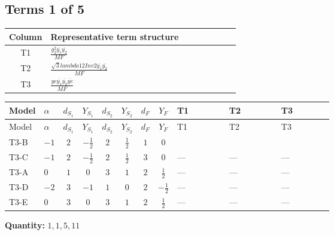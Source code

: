 \documentclass[8pt]{article}
\begin{document}
\begin{landscape}
\subsection*{Terms 1 of 5}
\begin{center}
\begin{tabular}{@{}c >{\raggedright\arraybackslash}p{0.82\linewidth}@{}}
\toprule
Column & Representative term structure \\
\midrule
T1 & \(\displaystyle \frac{g_{2}^{2} \overline{y_{1}} \overline{y_{2}}}{MF}\) \\
\midrule
T2 & \(\displaystyle \frac{\sqrt{3} lambda12Inv2 \overline{y_{1}} \overline{y_{2}}}{MF}\) \\
\midrule
T3 & \(\displaystyle \frac{ye \overline{y_{1}} \overline{y_{2}} \overline{ye}}{MF}\) \\
\midrule
\bottomrule
\end{tabular}
\end{center}
\smallskip
\tiny
\begin{longtable}{@{}llcccccc >{\raggedright\arraybackslash}p{0.21\linewidth} >{\raggedright\arraybackslash}p{0.21\linewidth} >{\raggedright\arraybackslash}p{0.21\linewidth}@{}}
\toprule
Model & $\alpha$ & $d_{S_1}$ & $Y_{S_1}$ & $d_{S_2}$ & $Y_{S_2}$ & $d_F$ & $Y_F$ & T1 & T2 & T3 \\
\midrule
\endfirsthead
\toprule
Model & $\alpha$ & $d_{S_1}$ & $Y_{S_1}$ & $d_{S_2}$ & $Y_{S_2}$ & $d_F$ & $Y_F$ & T1 & T2 & T3 \\
\midrule
\endhead
T3-B & $-1$ & $2$ & $-\frac{1}{2}$ & $2$ & $\frac{1}{2}$ & $1$ & $0$ & \scriptsize\adjustbox{max width=\linewidth}{$\begin{gathered} - \frac{3 g_{2}^{2} \overline{y_{1}} \overline{y_{2}}}{4 MF}\end{gathered}$} & \scriptsize\adjustbox{max width=\linewidth}{$\begin{gathered} - \frac{\sqrt{3} lambda12Inv2 \overline{y_{1}} \overline{y_{2}}}{3 MF}\end{gathered}$} & \scriptsize\adjustbox{max width=\linewidth}{$\begin{gathered} \frac{ye \overline{y_{1}} \overline{y_{2}} \overline{ye}}{4 MF}\end{gathered}$} \\
\midrule
T3-C & $-1$ & $2$ & $-\frac{1}{2}$ & $2$ & $\frac{1}{2}$ & $3$ & $0$ & --- & --- & --- \\
\midrule
T3-A & $0$ & $1$ & $0$ & $3$ & $1$ & $2$ & $\frac{1}{2}$ & --- & --- & --- \\
\midrule
T3-D & $-2$ & $3$ & $-1$ & $1$ & $0$ & $2$ & $-\frac{1}{2}$ & --- & --- & --- \\
\midrule
T3-E & $0$ & $3$ & $0$ & $3$ & $1$ & $2$ & $\frac{1}{2}$ & --- & --- & --- \\
\midrule
\bottomrule
\end{longtable}
\clearpage
\noindent\textbf{Quantity: }$\mathrm{1,1,5,11}$\par\smallskip

\end{landscape}
\end{document}
